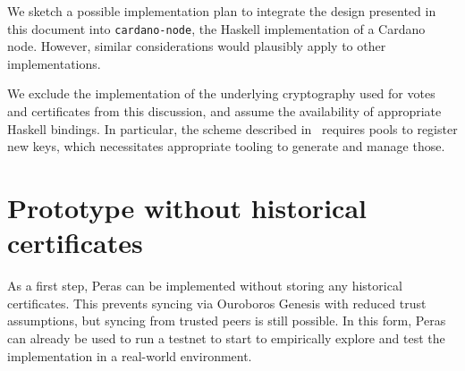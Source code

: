 We sketch a possible implementation plan to integrate the design presented in this document into \texttt{cardano-node}, the Haskell implementation of a Cardano node.
However, similar considerations would plausibly apply to other implementations.

We exclude the implementation of the underlying cryptography used for votes and certificates from this discussion, and assume the availability of appropriate Haskell bindings.
In particular, the scheme described in~\cite{peras-cert-report} requires pools to register new keys, which necessitates appropriate tooling to generate and manage those.

\section{Prototype without historical certificates}\label{sec:proto no certs}

As a first step, Peras can be implemented without storing any historical certificates.
This prevents syncing via Ouroboros Genesis with reduced trust assumptions, but syncing from trusted peers is still possible.
In this form, Peras can already be used to run a testnet to start to empirically explore and test the implementation in a real-world environment.


